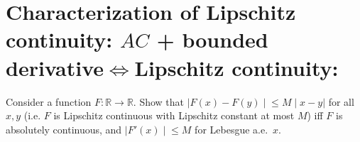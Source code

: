 \documentclass{qlnotes-export}
\begin{document}
\section{\texorpdfstring{Characterization of Lipschitz continuity: \(AC\) + bounded derivative\(\Leftrightarrow\)Lipschitz continuity:}{Characterization of Lipschitz continuity: AC + bounded derivative\textbackslash LeftrightarrowLipschitz continuity:}}\label{characterization-of-lipschitz-continuity-ac-bounded-derivativeifflipschitz-continuity}

Consider a function \(F:{\mathbb{R}}\rightarrow{\mathbb{R}}\). Show that \(\left. |F(x) - F(y) \middle| \leq M \middle| x - y| \right.\) for all \(x,y\) (i.e. \(F\) is Lipschitz continuous with Lipschitz constant at most \(M\)) iff \(F\) is absolutely continuous, and \(\left. |F'(x) \middle| \leq M \right.\) for Lebesgue a.e.~\(x\).
\end{document}
